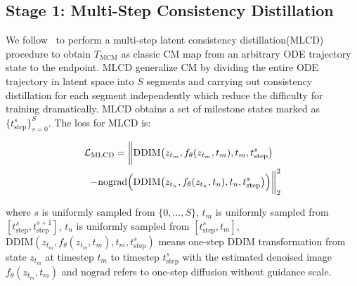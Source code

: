 \subsection{Stage 1: Multi-Step Consistency Distillation}
\label{sec:method_cm}
We follow~\citep{xie2024mlcm} to perform a multi-step latent consistency distillation(MLCD) procedure to obtain $T_{\text{MCM}}$ as classic CM map from an arbitrary ODE trajectory state to the endpoint. MLCD generalize CM by dividing the entire ODE trajectory in latent space into $S$ segments and carrying out consistency distillation for each segment independently which reduce the difficulty for training dramatically. MLCD obtains a set of milestone states marked as $\{t^s_{\text{step}}\}^S_{s=0}$. The loss for MLCD is:


\vspace{-5mm}
\begin{equation}
\begin{aligned}
\mathcal{L}_{\text{MLCD}} = \biggl\lVert 
  &\text{DDIM}\bigl( z_{t_m}, f_{\theta}(z_{t_m}, t_m), t_m, t^s_{\text{step}} \bigr) \\
  - \text{nograd}\Bigl( &\text{DDIM}\bigl( z_{t_n}, f_{\theta}(z_{t_n}, t_n), t_n, t^s_{\text{step}} \bigr) \Bigr) 
\biggr\rVert_2^2
\end{aligned}
\end{equation}
\vspace{-5mm}

where $s$ is uniformly sampled from $\{0, \dots, S\}$, $t_m$ is uniformly sampled from $[t^s_{\text{step}}, t^{s+1}_{\text{step}}]$, $t_n$ is uniformly sampled from $[t^s_{\text{step}}, t_m]$, $\text{DDIM}(z_{t_m}, f_{\theta}(z_{t_m}, t_m), t_m, t^s_{\text{step}})$ means one-step DDIM transformation from state $z_{t_m}$ at timestep $t_m$ to timestep $t^s_{\text{step}}$ with the estimated denoised image $f_{\theta}(z_{t_m}, t_m)$ and $\text{nograd}$ refers to one-step diffusion without guidance scale. 

